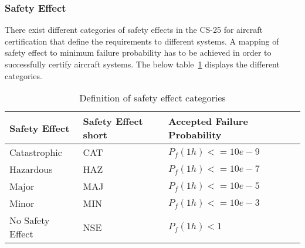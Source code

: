 \subsubsection{Safety Effect}
There exist different categories of safety effects in the CS-25 for aircraft certification that define the requirements to different systems.
A mapping of safety effect to minimum failure probability has to be achieved in order to successfully certify aircraft systems.
The below table~\ref{tab:safety-effect} displays the different categories.
\begin{table}[!htb]
    \centering
    \begin{tabular}{l|l|l}
        Safety Effect    & Safety Effect short & Accepted Failure Probability \\ \hline
        Catastrophic     & CAT                 & $P_f(1h) <= 10e-9$           \\
        Hazardous        & HAZ                 & $P_f(1h) <= 10e-7$           \\
        Major            & MAJ                 & $P_f(1h) <= 10e-5$           \\
        Minor            & MIN                 & $P_f(1h) <= 10e-3$           \\
        No Safety Effect & NSE                 & $P_f(1h) < 1$
    \end{tabular}
    \caption{Definition of safety effect categories}
    \label{tab:safety-effect}
\end{table}

